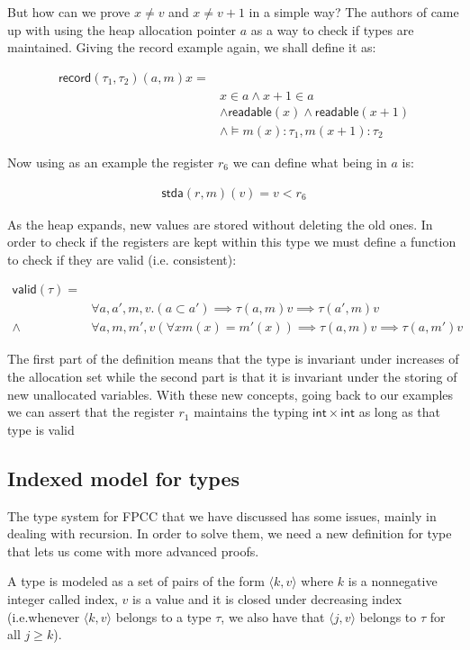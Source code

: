 \documentclass{article}
\begin{document}
But how can we prove $x\neq v$ and $x\neq v+1$ in a
simple way? The authors of \cite{appel:fpcc:semantic} 
came up with using the heap allocation pointer $a$ as 
a way to check if types are maintained. Giving the 
record example again, we shall define it as:

\begin{align*}
  \mathsf{record}(\tau_1,\tau_2)(a,m)x=&\\
  &x\in a\wedge x+1\in a\\
  &\wedge\mathsf{readable}(x)
    \wedge\mathsf{readable}(x+1)\\
  &\wedge \models m(x):\tau_1, m(x+1):\tau_2
\end{align*}

Now using as an example the register $r_6$ we can 
define what being in $a$ is:

\begin{align*}
    \mathsf{stda}(r,m)(v)=v<r_6
\end{align*}

As the heap expands, new values are stored without 
deleting the old ones. In order to check if the 
registers are kept within this type we must define 
a function to check if they are valid (i.e. 
consistent):

\begin{align*}
  \mathsf{valid}(\tau)=&\\
  &\forall a,a',m,v. (a \subset a') \implies 
    \tau(a,m)v \implies \tau(a',m)v\\
  \wedge&\forall a,m,m',v (\forall x m(x)=m'(x))
    \implies \tau(a,m)v \implies \tau(a,m')v
\end{align*}

The first part of the definition means that the type 
is invariant under increases of the allocation set
while the second part is that it is invariant under 
the storing of new unallocated variables. With these
new concepts, going back to our examples we can
assert that the register $r_1$ maintains the typing 
$\mathsf{int}\times\mathsf{int}$ as long as that 
type is valid 

\subsection*{Indexed model for types}
The type system for FPCC that we have discussed has 
some issues, mainly in dealing with recursion. 
In order to solve them, we need a new definition for
type that lets us come with more advanced proofs.

A type is modeled as a set of pairs of the form 
$\langle k, v \rangle$ where $k$ is a nonnegative integer called 
index, $v$ is a value and it is closed under decreasing index 
(i.e.whenever $\langle k, v \rangle$ belongs to a type $\tau$, 
we also have that $\langle j, v \rangle$ belongs to 
$\tau$ for all $j \geq k$).
\end{document}

